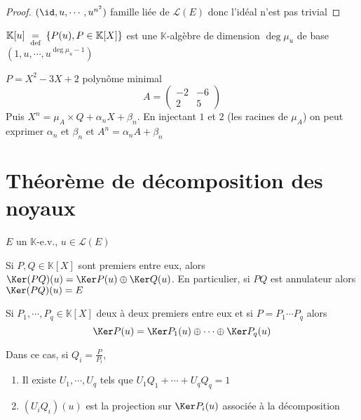\begin{proof}
    $(\id, u, \cdots, u^{n^2})$ famille liée de $\mathcal L(E)$ donc l'idéal n'est pas trivial
\end{proof}

\begin{prop}
    $\mathbb K[u]\;\underset{\text{def}}=\; \{P(u), P\in\mathbb K[X]\}$ est une $\mathbb K$-algèbre de dimension $\deg \mu_u$ de base $(1, u, \cdots, u^{\deg \mu_u-1})$
\end{prop}

\begin{ex}
    $P=X^2-3X+2$ polynôme minimal \[
        A= \begin{pmatrix}
            -2 & -6 \\ 2 & 5
        \end{pmatrix}
    \]
    Puis $X^n=\mu_A\times Q+\alpha_n X+\beta_n$. En injectant $1$ et $2$ (les racines de $\mu_A$) on peut exprimer $\alpha_n$ et $\beta_n$ et $A^n=\alpha_nA+\beta_n$
\end{ex}

\section{Théorème de décomposition des noyaux}

\begin{thm}
    \Hyp $E$ un $\mathbb K$-e.v., $u\in\mathcal L(E)$
    \begin{concenum}
    \item Si $P, Q\in\mathbb K[X]$ sont premiers entre eux, alors $\Ker (PQ)(u)=\Ker P(u)\oplus \Ker Q(u)$. En particulier, si $PQ$ est annulateur alors $\Ker(PQ)(u)=E$
    \item Si $P_1, \cdots, P_q\in\mathbb K[X]$ deux à deux premiers entre eux et si $P=P_1\cdots P_q$ alors \[
            \Ker P(u)=\Ker P_1(u)\oplus\cdots\oplus \Ker P_q(u)
        \]
    \item Dans ce cas, si $Q_i=\frac P{P_i}$, \begin{enumerate}
        \item Il existe $U_1, \cdots, U_q$ tels que $U_1Q_1+\cdots +U_qQ_q=1$
        \item $(U_iQ_i)(u)$ est la projection sur $\Ker P_i(u)$ associée à la décomposition
    \end{enumerate}
    \end{concenum}
\end{thm}


